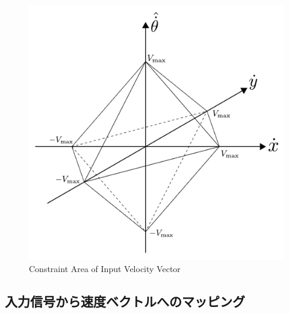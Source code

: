 \begin{figure}[h]
  \centering
  \includegraphics[width=120truemm, clip]{images/constraint.pdf}
  \caption{Constraint Area of Input Velocity Vector}
  \label{fig:constraint}
\end{figure}

\subsection{入力信号から速度ベクトルへのマッピング}